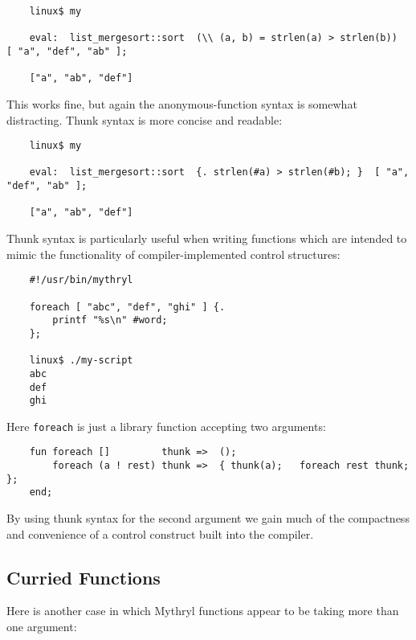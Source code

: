 \begin{verbatim}
    linux$ my

    eval:  list_mergesort::sort  (\\ (a, b) = strlen(a) > strlen(b))  [ "a", "def", "ab" ]; 

    ["a", "ab", "def"]
\end{verbatim}

This works fine, but again the anonymous-function syntax is 
somewhat distracting.  Thunk syntax is more concise and readable:

\begin{verbatim}
    linux$ my

    eval:  list_mergesort::sort  {. strlen(#a) > strlen(#b); }  [ "a", "def", "ab" ]; 

    ["a", "ab", "def"]
\end{verbatim}

Thunk syntax is particularly useful when writing functions which 
are intended to mimic the functionality of compiler-implemented 
control structures:

\begin{verbatim}
    #!/usr/bin/mythryl

    foreach [ "abc", "def", "ghi" ] {.
        printf "%s\n" #word;
    };

    linux$ ./my-script
    abc
    def
    ghi
\end{verbatim}

Here {\tt foreach} is just a library function accepting two 
arguments:

\begin{verbatim}
    fun foreach []         thunk =>  ();
        foreach (a ! rest) thunk =>  { thunk(a);   foreach rest thunk; };
    end;
\end{verbatim}

By using thunk syntax for the second argument we gain much of the compactness 
and convenience of a control construct built into the compiler.

\cutend*



\subsection{Curried Functions}
\label{section:ref:functions:curried-functions}

Here is another case in which Mythryl functions appear to be taking 
more than one argument:

